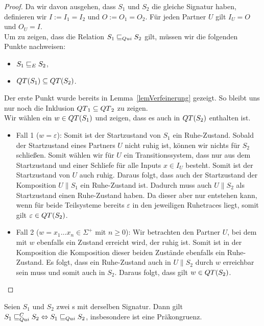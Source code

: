 \begin{proof}
  Da wir davon ausgehen, dass $S_1$ und $S_2$ die gleiche Signatur haben,
  definieren wir $I:=I_1=I_2$ und $O:=O_1=O_2$. Für jeden Partner $U$ gilt
  $I_U=O$ und $O_U=I$.\\
  Um zu zeigen, dass die Relation $S_1\sqsubseteq _{Qui} S_2$ gilt, müssen wir die
  folgenden Punkte nachweisen:
  \begin{itemize}
    \item $S_1\sqsubseteq _E S_2$,
    \item $QT{}(S_1)\subseteq QT{}(S_2)$.
  \end{itemize}
  Der erste Punkt wurde bereits in Lemma~\ref{lemVerfeinerung}
  gezeigt. So bleibt uns nur noch die Inklusion $QT{}_1\subseteq QT{}_2$ zu
  zeigen.\\
  Wir wählen ein $w\in QT{}(S_1)$ und zeigen, dass es auch in $QT{}(S_2)$
  enthalten ist.
  \begin{itemize}
    \item Fall 1 ($w=\varepsilon$): Somit ist der Startzustand von $S_1$ ein
      Ruhe-Zustand. Sobald der Startzustand eines Partners $U$ nicht
      ruhig ist, können wir nichts für $S_2$ schließen. Somit wählen wir
      für $U$ ein Transitionssystem, dass nur aus dem Startzustand und einer
      Schliefe für alle Inputs $x\in I_U$ besteht. Somit ist der Startzustand
      von $U$ auch ruhig. Daraus folgt, dass auch der Startzustand der
      Komposition $U\|S_1$ ein Ruhe-Zustand ist. Dadurch muss auch
      $U\|S_2$ als Startzustand einen Ruhe-Zustand haben. Da dieser aber
      nur entstehen kann, wenn für beide Teilsysteme bereits $\varepsilon$ in
      den jeweiligen Ruhetraces liegt, somit gilt $\varepsilon\in
      QT{}(S_2)$.
    \item Fall 2 ($w=x_1\dots x_n\in\Sigma ^+$ mit $n\geq 0$): Wir betrachten
      den Partner $U$, bei dem mit $w$ ebenfalls ein Zustand erreicht wird, der
      ruhig ist. Somit ist in der Komposition die Komposition dieser
      beiden Zustände ebenfalls ein Ruhe-Zustand. Es folgt, dass ein
      Ruhe-Zustand auch in $U\|S_2$ durch $w$ erreichbar sein muss und
      somit auch in $S_2$. Daraus folgt, dass gilt $w\in QT{}(S_2)$.
  \end{itemize}
\end{proof}

\begin{satz}
  \label{satzQuiFullAbst}
  Seien $S_1$ und $S_2$ zwei \EIO{}s mit derselben Signatur. Dann gilt
  $S_1\sqsubseteq _{Qui}^C S_2\Leftrightarrow S_1\sqsubseteq _{Qui} S_2$, insbesondere ist \QRel{} eine
  Präkongruenz.
\end{satz}

